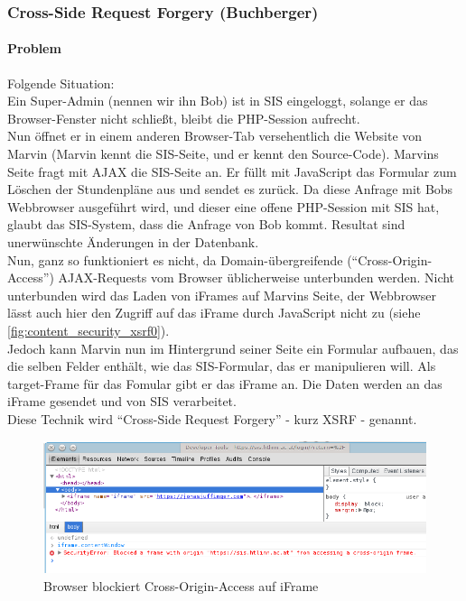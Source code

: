 \subsubsection{Cross-Side Request Forgery (Buchberger)}
\label{sec:content_security_xsrf}
\paragraph{Problem\\}
Folgende Situation:\\
Ein Super-Admin (nennen wir ihn Bob) ist in SIS eingeloggt, solange er das Browser-Fenster nicht schließt, bleibt die PHP-Session aufrecht. \\
Nun öffnet er in einem anderen Browser-Tab versehentlich die Website von Marvin (Marvin kennt die SIS-Seite, und er kennt den Source-Code). Marvins Seite fragt mit AJAX die SIS-Seite an. Er füllt mit JavaScript das Formular zum Löschen der Stundenpläne aus und sendet es zurück. Da diese Anfrage mit Bobs Webbrowser ausgeführt wird, und dieser eine offene PHP-Session mit SIS hat, glaubt das SIS-System, dass die Anfrage von Bob kommt. Resultat sind unerwünschte Änderungen in der Datenbank.\\
Nun, ganz so funktioniert es nicht, da Domain-übergreifende (\enquote{Cross-Origin-Access}) AJAX-Requests vom Browser üblicherweise unterbunden werden. Nicht unterbunden wird das Laden von iFrames auf Marvins Seite, der Webbrowser lässt auch hier den Zugriff auf das iFrame durch JavaScript nicht zu (siehe \autoref{fig:content_security_xsrf0}).\\
Jedoch kann Marvin nun im Hintergrund seiner Seite ein Formular aufbauen, das die selben Felder enthält, wie das SIS-Formular, das er manipulieren will. Als target-Frame für das Fomular gibt er das iFrame an. Die Daten werden an das iFrame gesendet und von SIS verarbeitet.\\
Diese Technik wird \enquote{Cross-Side Request Forgery} - kurz XSRF - genannt.

\begin{figure}[H]
\centering
\includegraphics[keepaspectratio=true, width=14cm]{images/screenshots/xsrf0.png}
\caption{Browser blockiert Cross-Origin-Access auf iFrame}
\label{fig:content_security_xsrf0}
\end{figure}
